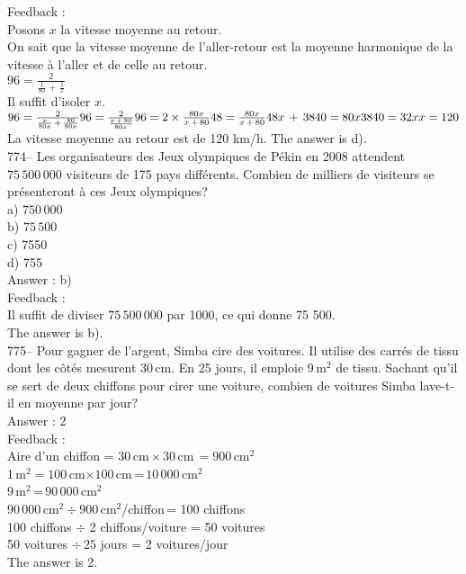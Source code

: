 \documentclass[letterpaper, 12pt]{article}
\begin{document}
Feedback : \\
Posons $x$ la vitesse moyenne au retour.\\
On sait que la vitesse moyenne de l'aller-retour est la moyenne harmonique
de la vitesse \`a l'aller et de celle au retour.  \\[2mm]
$96=\frac{2}{\frac{1}{80}\,+\,\frac{1}{x}}$\\[2mm]
Il suffit d'isoler $x$.\\[2mm]
$96=\frac{2}{\frac{x}{80x}\,+\,\frac{80}{80x}}\\[2mm]
96=\frac{2}{\frac{x\,+\,80}{80x}}\\[2mm]
96=2\times\frac{80x}{x\,+\,80}\\[2mm]
48=\frac{80x}{x\,+\,80}\\[2mm]
48x\,+\,3840=80x\\[2mm]
3840=32x\\[2mm]
x=120$\\[2mm]
La vitesse moyenne au retour est de 120 km/h.  The answer is d).\\

774-- Les organisateurs des Jeux olympiques de P\'ekin en 2008 attendent
$75\,500\,000$ visiteurs de 175 pays diff\'erents.  Combien de milliers de
visiteurs se pr\'esenteront \`a ces Jeux olympiques?\\
a) $750\,000$\\
b) $75\,500$\\
c) 7550\\
d) 755\\

Answer : b)\\

Feedback : \\
Il suffit de diviser  $75\,500\,000$ par 1000, ce qui donne 75 500.\\
The answer is b).\\

775-- Pour gagner de l'argent, Simba cire des voitures.  Il utilise des
carr\'es de tissu dont les c\^ot\'es mesurent 30\,cm.  En 25 jours, il
emploie 9\,m$^{2}$ de tissu.  Sachant qu'il se sert de deux chiffons pour
cirer une voiture, combien de voitures Simba lave-t-il en moyenne par
jour?\\

Answer : 2\\

Feedback : \\
Aire d'un chiffon = $30$\,cm\,$\times\,30$\,cm$\,=900$\,cm$^{2}$\\
1\,m$^{2}=100$\,cm$\times100$\,cm\,=\,$10\,000$\,cm$^{2}$\\
9\,m$^{2}$\,=\,$90\,000$\,cm$^{2}$\\
$90\,000$\,cm$^{2}\div900$\,cm$^{2}$/chiffon\,= 100 chiffons\\
100 chiffons $\div$ 2 chiffons/voiture  = 50 voitures\\
50 voitures $\div \,25 $ jours = 2 voitures/jour\\
The answer is 2.\\
\end{document}
